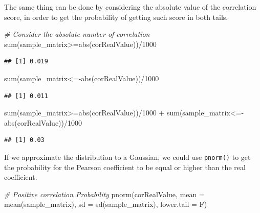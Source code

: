 \documentclass[
  notitlepage,
  onecolumn,
  openany]{book}
\newenvironment{Shaded}{\begin{snugshade}}{\end{snugshade}}
\newcommand{\AttributeTok}[1]{\textcolor[rgb]{0.77,0.63,0.00}{#1}}
\newcommand{\CommentTok}[1]{\textcolor[rgb]{0.56,0.35,0.01}{\textit{#1}}}
\newcommand{\DecValTok}[1]{\textcolor[rgb]{0.00,0.00,0.81}{#1}}
\newcommand{\FunctionTok}[1]{\textcolor[rgb]{0.00,0.00,0.00}{#1}}
\newcommand{\NormalTok}[1]{#1}
\newcommand{\SpecialCharTok}[1]{\textcolor[rgb]{0.00,0.00,0.00}{#1}}
\begin{document}
The same thing can be done by considering the absolute value of the correlation score, in order to get the probability of getting such score in both tails.

\begin{Shaded}
\begin{Highlighting}[]
\CommentTok{\# Consider the absolute number of correlation}
\FunctionTok{sum}\NormalTok{(sample\_matrix}\SpecialCharTok{\textgreater{}=}\FunctionTok{abs}\NormalTok{(corRealValue))}\SpecialCharTok{/}\DecValTok{1000}
\end{Highlighting}
\end{Shaded}

\begin{verbatim}
## [1] 0.019
\end{verbatim}

\begin{Shaded}
\begin{Highlighting}[]
\FunctionTok{sum}\NormalTok{(sample\_matrix}\SpecialCharTok{\textless{}={-}}\FunctionTok{abs}\NormalTok{(corRealValue))}\SpecialCharTok{/}\DecValTok{1000}
\end{Highlighting}
\end{Shaded}

\begin{verbatim}
## [1] 0.011
\end{verbatim}

\begin{Shaded}
\begin{Highlighting}[]
\FunctionTok{sum}\NormalTok{(sample\_matrix}\SpecialCharTok{\textgreater{}=}\FunctionTok{abs}\NormalTok{(corRealValue))}\SpecialCharTok{/}\DecValTok{1000} \SpecialCharTok{+}
  \FunctionTok{sum}\NormalTok{(sample\_matrix}\SpecialCharTok{\textless{}={-}}\FunctionTok{abs}\NormalTok{(corRealValue))}\SpecialCharTok{/}\DecValTok{1000}
\end{Highlighting}
\end{Shaded}

\begin{verbatim}
## [1] 0.03
\end{verbatim}

If we approximate the distribution to a Gaussian, we could use \texttt{pnorm()} to get the probability for the Pearson coefficient to be equal or higher than the real coefficient.

\begin{Shaded}
\begin{Highlighting}[]
\CommentTok{\# Positive correlation Probability}
\FunctionTok{pnorm}\NormalTok{(corRealValue, }\AttributeTok{mean =} \FunctionTok{mean}\NormalTok{(sample\_matrix), }
      \AttributeTok{sd =} \FunctionTok{sd}\NormalTok{(sample\_matrix), }\AttributeTok{lower.tail =}\NormalTok{ F)}
\end{Highlighting}
\end{Shaded}
\end{document}
